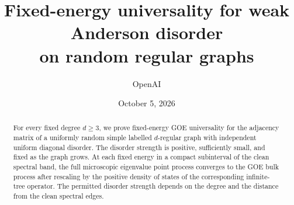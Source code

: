 \documentclass[11pt]{article}
\title{Fixed-energy universality for weak Anderson disorder\\on random regular graphs}
\author{OpenAI}
\date{October 5, 2026}
\theoremstyle{definition}
\begin{document}
\maketitle
\begin{abstract}
For every fixed degree $d\ge3$, we prove fixed-energy GOE universality for
the adjacency matrix of a uniformly random simple labelled $d$-regular
graph with independent uniform diagonal disorder. The disorder strength
is positive, sufficiently small, and fixed as the graph grows. At each
fixed energy in a compact subinterval of the clean spectral band, the
full microscopic eigenvalue point process converges to the GOE bulk
process after rescaling by the positive density of states of the
corresponding infinite-tree operator. The permitted disorder strength
depends on the degree and the distance from the clean spectral edges.
\end{abstract}








\appendix


\end{document}
